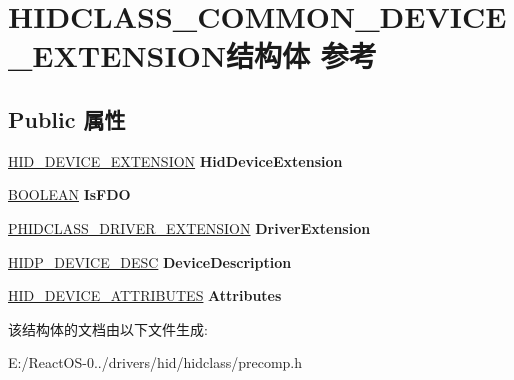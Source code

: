 \hypertarget{struct_h_i_d_c_l_a_s_s___c_o_m_m_o_n___d_e_v_i_c_e___e_x_t_e_n_s_i_o_n}{}\section{H\+I\+D\+C\+L\+A\+S\+S\+\_\+\+C\+O\+M\+M\+O\+N\+\_\+\+D\+E\+V\+I\+C\+E\+\_\+\+E\+X\+T\+E\+N\+S\+I\+O\+N结构体 参考}
\label{struct_h_i_d_c_l_a_s_s___c_o_m_m_o_n___d_e_v_i_c_e___e_x_t_e_n_s_i_o_n}
\subsection*{Public 属性}
\begin{DoxyCompactItemize}
\item 
\mbox{\label{struct_h_i_d_c_l_a_s_s___c_o_m_m_o_n___d_e_v_i_c_e___e_x_t_e_n_s_i_o_n_aada61e65251e526b02af2d6a8587696f}} 
\hyperlink{struct___h_i_d___d_e_v_i_c_e___e_x_t_e_n_s_i_o_n}{H\+I\+D\+\_\+\+D\+E\+V\+I\+C\+E\+\_\+\+E\+X\+T\+E\+N\+S\+I\+ON} {\bfseries Hid\+Device\+Extension}
\item 
\mbox{\label{struct_h_i_d_c_l_a_s_s___c_o_m_m_o_n___d_e_v_i_c_e___e_x_t_e_n_s_i_o_n_a5b8ca203e217a1796c20517e72a2408f}} 
\hyperlink{_processor_bind_8h_a112e3146cb38b6ee95e64d85842e380a}{B\+O\+O\+L\+E\+AN} {\bfseries Is\+F\+DO}
\item 
\mbox{\label{struct_h_i_d_c_l_a_s_s___c_o_m_m_o_n___d_e_v_i_c_e___e_x_t_e_n_s_i_o_n_a3f5d45ec6776cec65f79359f1dd0855a}} 
\hyperlink{struct_h_i_d_c_l_a_s_s___d_r_i_v_e_r___e_x_t_e_n_s_i_o_n}{P\+H\+I\+D\+C\+L\+A\+S\+S\+\_\+\+D\+R\+I\+V\+E\+R\+\_\+\+E\+X\+T\+E\+N\+S\+I\+ON} {\bfseries Driver\+Extension}
\item 
\mbox{\label{struct_h_i_d_c_l_a_s_s___c_o_m_m_o_n___d_e_v_i_c_e___e_x_t_e_n_s_i_o_n_a0ffb2b34fd6a21779ef7a68308176418}} 
\hyperlink{struct___h_i_d_p___d_e_v_i_c_e___d_e_s_c}{H\+I\+D\+P\+\_\+\+D\+E\+V\+I\+C\+E\+\_\+\+D\+E\+SC} {\bfseries Device\+Description}
\item 
\mbox{\label{struct_h_i_d_c_l_a_s_s___c_o_m_m_o_n___d_e_v_i_c_e___e_x_t_e_n_s_i_o_n_a942e12ed4393816c535aeb2ea0c86ef3}} 
\hyperlink{struct___h_i_d___d_e_v_i_c_e___a_t_t_r_i_b_u_t_e_s}{H\+I\+D\+\_\+\+D\+E\+V\+I\+C\+E\+\_\+\+A\+T\+T\+R\+I\+B\+U\+T\+ES} {\bfseries Attributes}
\end{DoxyCompactItemize}


该结构体的文档由以下文件生成\+:\begin{DoxyCompactItemize}
\item 
E\+:/\+React\+O\+S-\/0../drivers/hid/hidclass/precomp.\+h\end{DoxyCompactItemize}
